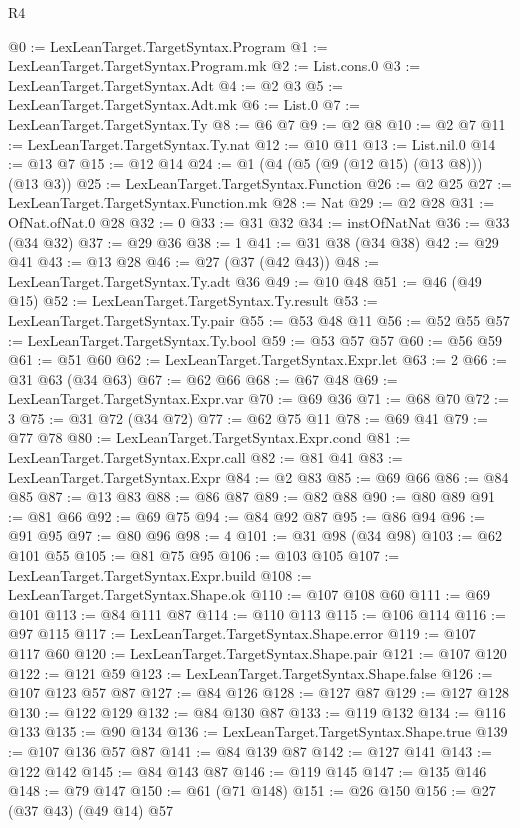 \begin{lexlean}{R4}
\begin{coremodule}
@0 := LexLeanTarget.TargetSyntax.Program
@1 := LexLeanTarget.TargetSyntax.Program.mk
@2 := List.cons.{0}
@3 := LexLeanTarget.TargetSyntax.Adt
@4 := @2 @3
@5 := LexLeanTarget.TargetSyntax.Adt.mk
@6 := List.{0}
@7 := LexLeanTarget.TargetSyntax.Ty
@8 := @6 @7
@9 := @2 @8
@10 := @2 @7
@11 := LexLeanTarget.TargetSyntax.Ty.nat
@12 := @10 @11
@13 := List.nil.{0}
@14 := @13 @7
@15 := @12 @14
@24 := @1 (@4 (@5 (@9 (@12 @15) (@13 @8))) (@13 @3))
@25 := LexLeanTarget.TargetSyntax.Function
@26 := @2 @25
@27 := LexLeanTarget.TargetSyntax.Function.mk
@28 := Nat
@29 := @2 @28
@31 := OfNat.ofNat.{0} @28
@32 := 0
@33 := @31 @32
@34 := instOfNatNat
@36 := @33 (@34 @32)
@37 := @29 @36
@38 := 1
@41 := @31 @38 (@34 @38)
@42 := @29 @41
@43 := @13 @28
@46 := @27 (@37 (@42 @43))
@48 := LexLeanTarget.TargetSyntax.Ty.adt @36
@49 := @10 @48
@51 := @46 (@49 @15)
@52 := LexLeanTarget.TargetSyntax.Ty.result
@53 := LexLeanTarget.TargetSyntax.Ty.pair
@55 := @53 @48 @11
@56 := @52 @55
@57 := LexLeanTarget.TargetSyntax.Ty.bool
@59 := @53 @57 @57
@60 := @56 @59
@61 := @51 @60
@62 := LexLeanTarget.TargetSyntax.Expr.let
@63 := 2
@66 := @31 @63 (@34 @63)
@67 := @62 @66
@68 := @67 @48
@69 := LexLeanTarget.TargetSyntax.Expr.var
@70 := @69 @36
@71 := @68 @70
@72 := 3
@75 := @31 @72 (@34 @72)
@77 := @62 @75 @11
@78 := @69 @41
@79 := @77 @78
@80 := LexLeanTarget.TargetSyntax.Expr.cond
@81 := LexLeanTarget.TargetSyntax.Expr.call
@82 := @81 @41
@83 := LexLeanTarget.TargetSyntax.Expr
@84 := @2 @83
@85 := @69 @66
@86 := @84 @85
@87 := @13 @83
@88 := @86 @87
@89 := @82 @88
@90 := @80 @89
@91 := @81 @66
@92 := @69 @75
@94 := @84 @92 @87
@95 := @86 @94
@96 := @91 @95
@97 := @80 @96
@98 := 4
@101 := @31 @98 (@34 @98)
@103 := @62 @101 @55
@105 := @81 @75 @95
@106 := @103 @105
@107 := LexLeanTarget.TargetSyntax.Expr.build
@108 := LexLeanTarget.TargetSyntax.Shape.ok
@110 := @107 @108 @60
@111 := @69 @101
@113 := @84 @111 @87
@114 := @110 @113
@115 := @106 @114
@116 := @97 @115
@117 := LexLeanTarget.TargetSyntax.Shape.error
@119 := @107 @117 @60
@120 := LexLeanTarget.TargetSyntax.Shape.pair
@121 := @107 @120
@122 := @121 @59
@123 := LexLeanTarget.TargetSyntax.Shape.false
@126 := @107 @123 @57 @87
@127 := @84 @126
@128 := @127 @87
@129 := @127 @128
@130 := @122 @129
@132 := @84 @130 @87
@133 := @119 @132
@134 := @116 @133
@135 := @90 @134
@136 := LexLeanTarget.TargetSyntax.Shape.true
@139 := @107 @136 @57 @87
@141 := @84 @139 @87
@142 := @127 @141
@143 := @122 @142
@145 := @84 @143 @87
@146 := @119 @145
@147 := @135 @146
@148 := @79 @147
@150 := @61 (@71 @148)
@151 := @26 @150
@156 := @27 (@37 @43) (@49 @14) @57

\end{coremodule}
\end{lexlean}
